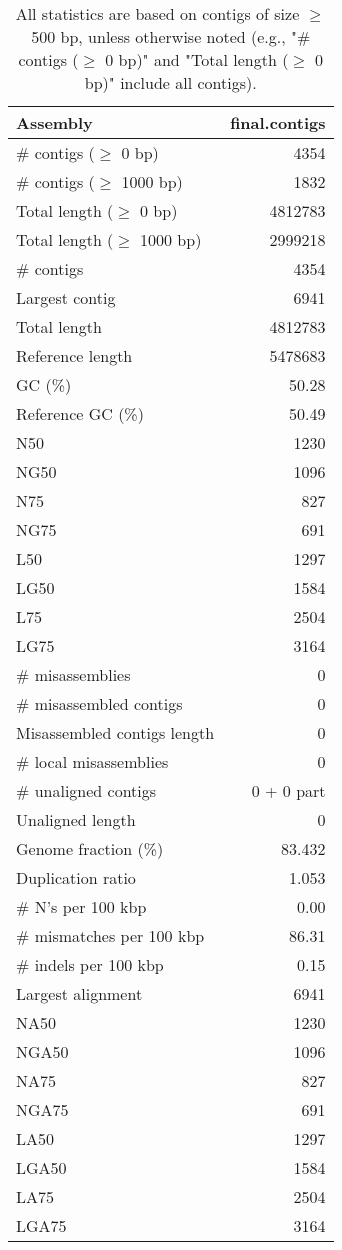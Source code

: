 \documentclass[12pt,a4paper]{article}
\begin{document}
\begin{table}[ht]
\begin{center}
\caption{All statistics are based on contigs of size $\geq$ 500 bp, unless otherwise noted (e.g., "\# contigs ($\geq$ 0 bp)" and "Total length ($\geq$ 0 bp)" include all contigs).}
\begin{tabular}{|l*{1}{|r}|}
\hline
Assembly & final.contigs \\ \hline
\# contigs ($\geq$ 0 bp) & 4354 \\ \hline
\# contigs ($\geq$ 1000 bp) & 1832 \\ \hline
Total length ($\geq$ 0 bp) & 4812783 \\ \hline
Total length ($\geq$ 1000 bp) & 2999218 \\ \hline
\# contigs & 4354 \\ \hline
Largest contig & 6941 \\ \hline
Total length & 4812783 \\ \hline
Reference length & 5478683 \\ \hline
GC (\%) & 50.28 \\ \hline
Reference GC (\%) & 50.49 \\ \hline
N50 & 1230 \\ \hline
NG50 & 1096 \\ \hline
N75 & 827 \\ \hline
NG75 & 691 \\ \hline
L50 & 1297 \\ \hline
LG50 & 1584 \\ \hline
L75 & 2504 \\ \hline
LG75 & 3164 \\ \hline
\# misassemblies & 0 \\ \hline
\# misassembled contigs & 0 \\ \hline
Misassembled contigs length & 0 \\ \hline
\# local misassemblies & 0 \\ \hline
\# unaligned contigs & 0 + 0 part \\ \hline
Unaligned length & 0 \\ \hline
Genome fraction (\%) & 83.432 \\ \hline
Duplication ratio & 1.053 \\ \hline
\# N's per 100 kbp & 0.00 \\ \hline
\# mismatches per 100 kbp & 86.31 \\ \hline
\# indels per 100 kbp & 0.15 \\ \hline
Largest alignment & 6941 \\ \hline
NA50 & 1230 \\ \hline
NGA50 & 1096 \\ \hline
NA75 & 827 \\ \hline
NGA75 & 691 \\ \hline
LA50 & 1297 \\ \hline
LGA50 & 1584 \\ \hline
LA75 & 2504 \\ \hline
LGA75 & 3164 \\ \hline
\end{tabular}
\end{center}
\end{table}
\end{document}
